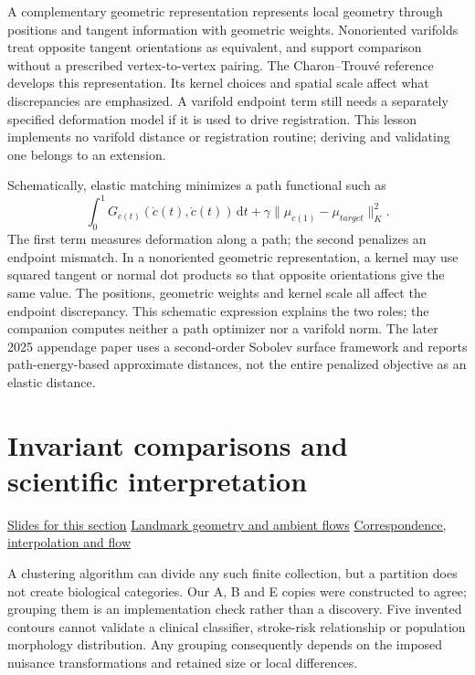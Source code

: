 \documentclass[11pt,letterpaper]{article}
\theoremstyle{definition}\newtheorem{definition}{Definition}\newtheorem{example}{Example}
\numberwithin{equation}{section}
\begin{document}
A complementary geometric representation represents local geometry through positions and tangent information with geometric weights. Nonoriented varifolds treat opposite tangent orientations as equivalent, and support comparison without a prescribed vertex-to-vertex pairing. The Charon--Trouvé reference develops this representation. Its kernel choices and spatial scale affect what discrepancies are emphasized. A varifold endpoint term still needs a separately specified deformation model if it is used to drive registration. This lesson implements no varifold distance or registration routine; deriving and validating one belongs to an extension.

Schematically, elastic matching minimizes a path functional such as
\[
 \int_0^1 G_{c(t)}(\dot c(t),\dot c(t))\,\mathrm dt
 +\gamma\|\mu_{c(1)}-\mu_{target}\|_K^2.
\]
The first term measures deformation along a path; the second penalizes an endpoint mismatch. In a nonoriented geometric representation, a kernel may use squared tangent or normal dot products so that opposite orientations give the same value. The positions, geometric weights and kernel scale all affect the endpoint discrepancy. This schematic expression explains the two roles; the companion computes neither a path optimizer nor a varifold norm. The later 2025 appendage paper uses a second-order Sobolev surface framework and reports path-energy-based approximate distances, not the entire penalized objective as an elastic distance.
\section{Invariant comparisons and scientific interpretation}
\hypertarget{note-invariant-comparisons-and-scientific-interpretation}{}\label{note:invariant-comparisons-and-scientific-interpretation}
{\small \href{slides.html\#frame=the-implemented-and-contextual-calculations\&step=1}{Slides for this section} \quad \href{../modules/shape-lab/index.html}{Landmark geometry and ambient flows} \quad \href{../modules/animations/landmark-flow.html}{Correspondence, interpolation and flow}}\par
A clustering algorithm can divide any such finite collection, but a partition does not create biological categories. Our A, B and E copies were constructed to agree; grouping them is an implementation check rather than a discovery. Five invented contours cannot validate a clinical classifier, stroke-risk relationship or population morphology distribution. Any grouping consequently depends on the imposed nuisance transformations and retained size or local differences.
\end{document}
